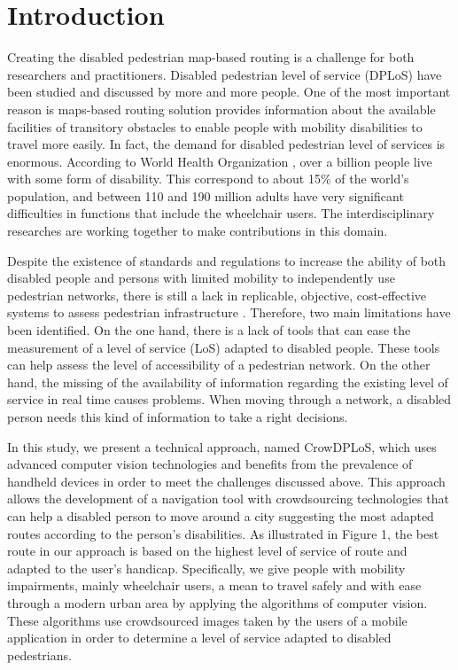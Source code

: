 \documentclass[10pt,conference,a4paper]{IEEEtran}
\begin{document}
\section{Introduction}


Creating the disabled pedestrian map-based routing is a challenge for both researchers and practitioners. Disabled pedestrian level of service (DPLoS) have been studied and discussed by more and more people. One of the most important reason is maps-based routing solution provides information about the available facilities of transitory obstacles to enable people with mobility disabilities to travel more easily. In fact, the demand for disabled pedestrian level of services is enormous. According to World Health Organization \cite{who2017}, over a billion people live with some form of disability. This correspond to about 15\% of the world’s population, and between 110 and 190 million adults have very significant difficulties in functions that include the wheelchair users. The interdisciplinary researches are working together to make contributions in this domain.

Despite the existence of standards and regulations to increase the ability of both disabled people and persons with limited mobility to independently use pedestrian networks, there is still a lack in replicable, objective, cost-effective systems to assess pedestrian infrastructure \cite{frackelton2013measuring}. Therefore, two main limitations have been identified. On the one hand, there is a lack of tools that can ease the measurement of a level of service (LoS) adapted to disabled people. These tools can help assess the level of accessibility of a pedestrian network. On the other hand, the missing of the availability of information regarding the existing level of service in real time causes problems. When moving through a network, a disabled person needs this kind of information to take a right decisions.

In this study, we present a technical approach, named CrowDPLoS, which uses advanced computer vision technologies and benefits from the prevalence of handheld devices in order to meet the challenges discussed above. This approach allows the development of a navigation tool with crowdsourcing technologies that can help a disabled person to move around a city suggesting the most adapted routes according to the person’s disabilities. As illustrated in Figure 1, the best route in our approach is based on the highest level of service of route and adapted to the user’s handicap. Specifically, we give people with mobility impairments, mainly wheelchair users, a mean to travel safely and with ease through a modern urban area by applying the algorithms of computer vision. These algorithms use crowdsourced images taken by the users of a mobile application in order to determine a level of service adapted to disabled pedestrians.
\end{document}
